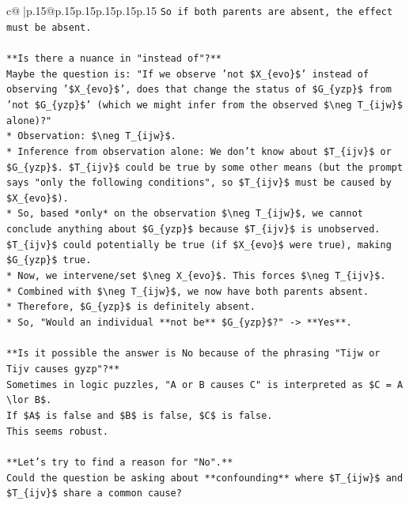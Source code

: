 \documentclass{article}
\begin{document}
{\begin{supertabular}{c@{$\;$}|p{.15\linewidth}@{}p{.15\linewidth}p{.15\linewidth}p{.15\linewidth}p{.15\linewidth}p{.15\linewidth}}
{{{\texttt{So if both parents are absent, the effect must be absent.} \\
\\ 
\texttt{**Is there a nuance in "instead of"?**} \\
\texttt{Maybe the question is: "If we observe 'not \$X\_\{evo\}\$' instead of observing '\$X\_\{evo\}\$', does that change the status of \$G\_\{yzp\}\$ from 'not \$G\_\{yzp\}\$' (which we might infer from the observed \$\textbackslash{}neg T\_\{ijw\}\$ alone)?"} \\
\texttt{*   Observation: \$\textbackslash{}neg T\_\{ijw\}\$.} \\
\texttt{*   Inference from observation alone: We don't know about \$T\_\{ijv\}\$ or \$G\_\{yzp\}\$. \$T\_\{ijv\}\$ could be true by some other means (but the prompt says "only the following conditions", so \$T\_\{ijv\}\$ must be caused by \$X\_\{evo\}\$).} \\
\texttt{*   So, based *only* on the observation \$\textbackslash{}neg T\_\{ijw\}\$, we cannot conclude anything about \$G\_\{yzp\}\$ because \$T\_\{ijv\}\$ is unobserved. \$T\_\{ijv\}\$ could potentially be true (if \$X\_\{evo\}\$ were true), making \$G\_\{yzp\}\$ true.} \\
\texttt{*   Now, we intervene/set \$\textbackslash{}neg X\_\{evo\}\$. This forces \$\textbackslash{}neg T\_\{ijv\}\$.} \\
\texttt{*   Combined with \$\textbackslash{}neg T\_\{ijw\}\$, we now have both parents absent.} \\
\texttt{*   Therefore, \$G\_\{yzp\}\$ is definitely absent.} \\
\texttt{*   So, "Would an individual **not be** \$G\_\{yzp\}\$?" {-}> **Yes**.} \\
\\ 
\texttt{**Is it possible the answer is No because of the phrasing "Tijw or Tijv causes gyzp"?**} \\
\texttt{Sometimes in logic puzzles, "A or B causes C" is interpreted as \$C = A \textbackslash{}lor B\$.} \\
\texttt{If \$A\$ is false and \$B\$ is false, \$C\$ is false.} \\
\texttt{This seems robust.} \\
\\ 
\texttt{**Let's try to find a reason for "No".**} \\
\texttt{Could the question be asking about **confounding** where \$T\_\{ijw\}\$ and \$T\_\{ijv\}\$ share a common cause?} \\
}}}
\end{supertabular}}
\end{document}
